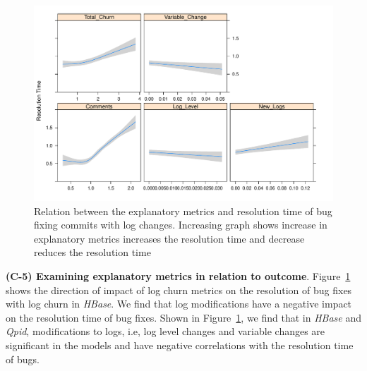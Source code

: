 \begin{figure}[t]
	\begin{minipage}{0.5\columnwidth}
		\hspace*{1.9cm}	\includegraphics[width=1.45\textwidth]{HbaseDirectionPlot}

	\end{minipage}
	\hspace*{1.cm}\caption{Relation between the explanatory metrics and resolution time of bug fixing commits with log changes. Increasing graph shows increase in explanatory metrics increases the resolution time and decrease reduces the resolution time \label{fig:HbaseDirectionPlot}}
\end{figure}

\textbf{(C-5) Examining explanatory metrics in relation to outcome}. Figure~\ref{fig:HbaseDirectionPlot} shows the direction of impact of log churn metrics on the resolution of bug fixes with log churn in \emph{HBase}. We find that log modifications have a negative impact on the resolution time of bug fixes. Shown in Figure~\ref{fig:HbaseDirectionPlot}, we find that in \emph{HBase} and \emph{Qpid}, modifications to logs, i.e, log level changes and variable changes are significant in the models and have negative correlations with the resolution time of bugs. 

